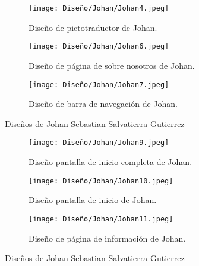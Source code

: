 \begin{figure}[h!]
  \ContinuedFloat
  \begin{subfigure}{\textwidth}
    \centering
    \texttt{[image: Diseño/Johan/Johan4.jpeg]}
    \caption{Diseño de pictotraductor de Johan.}
    \label{Johan4}
  \end{subfigure}
  
  \begin{subfigure}{\textwidth}
    \centering
    \texttt{[image: Diseño/Johan/Johan6.jpeg]}
    \caption{Diseño de página de sobre nosotros de Johan.}
    \label{Johan6}
  \end{subfigure}
  
  \begin{subfigure}{\textwidth}
    \centering
    \texttt{[image: Diseño/Johan/Johan7.jpeg]}
    \caption{Diseño de barra de navegación de Johan.}
    \label{Johan7}
  \end{subfigure}

  \caption{Diseños de Johan Sebastian Salvatierra Gutierrez}
  \label{fig:disenyoJohan}
\end{figure}

\begin{figure}[h!]
  \ContinuedFloat
  \begin{subfigure}{\textwidth}
    \centering
    \texttt{[image: Diseño/Johan/Johan9.jpeg]}
    \caption{Diseño pantalla de inicio completa de Johan.}
    \label{Johan9}
  \end{subfigure}

  \begin{subfigure}{\textwidth}
    \centering
    \texttt{[image: Diseño/Johan/Johan10.jpeg]}
    \caption{Diseño pantalla de inicio de Johan.}
    \label{Johan10}
  \end{subfigure}

  \begin{subfigure}{\textwidth}
    \centering
    \texttt{[image: Diseño/Johan/Johan11.jpeg]}
	\caption{Diseño de página de información de Johan.}
	\label{Johan11}
  \end{subfigure}

  \caption{Diseños de Johan Sebastian Salvatierra Gutierrez}
  \label{fig:disenyoJohan}
\end{figure}